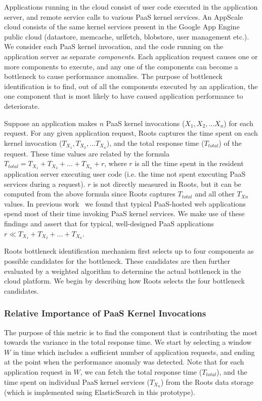 Applications running in the cloud consist of user code executed in the application server, 
and remote service calls to various PaaS kernel services. An AppScale cloud
consists of the same kernel services present in the Google App Engine public cloud (datastore, memcache,
urlfetch, blobstore, user management etc.).
We consider each PaaS kernel invocation, and the code running on the application server as 
separate \textit{components}. Each application request causes one or more components to
execute, and any one of the components can become a bottleneck to cause performance anomalies.  
The purpose of bottleneck identification is to find, out of all
the components executed by an application, the one component that is most likely to have caused 
application performance to deteriorate.

Suppose an application makes $n$ PaaS kernel invocations ($X_1, X_2, ... X_n$) for each request. 
For any given application request,
Roots captures the time spent on each kernel invocation ($T_{X_1}, T_{X_2}, ... T_{X_n}$), and the 
total response time ($T_{total}$) of the request. These time values are related by the formula
$T_{total} = T_{X_1} + T_{X_2} + ... + T_{X_n} + r$, where $r$ is all the time spent in the resident 
application server executing user code (i.e. the time not
spent executing PaaS services during a request). $r$ is not
directly measured in Roots, but it can be computed from the above formula 
since Roots captures $T_{total}$ and all other $T_{Xn}$ values. In previous
work~\cite{Jayathilaka:2015:RTS:2806777.2806842} we found that typical
PaaS-hosted web applications spend most of their time invoking PaaS kernel services.
We make use of these findings and assert that for typical,
well-designed PaaS applications $r \ll T_{X_1} + T_{X_2} + ... + T_{X_n}$.

Roots bottleneck identification mechanism first
selects up to four components as possible candidates
for the bottleneck. These candidates are then further evaluated by a weighted algorithm to
determine the actual bottleneck in the cloud platform. We 
begin by describing how Roots selects the four bottleneck candidates.

\subsubsection{Relative Importance of PaaS Kernel Invocations} 
The purpose of this metric is to find the component that is contributing 
the most towards the variance in the total response time. 
We start by selecting a window $W$ in time which includes a sufficient number of application requests,
and ending at the point when the performance anomaly was detected. Note that for each application request
in $W$, we can fetch the total response time ($T_{total}$), and the time spent on individual PaaS kernel
services ($T_{X_n}$) from the Roots data storage (which is
implemented using ElasticSearch in this prototype).

